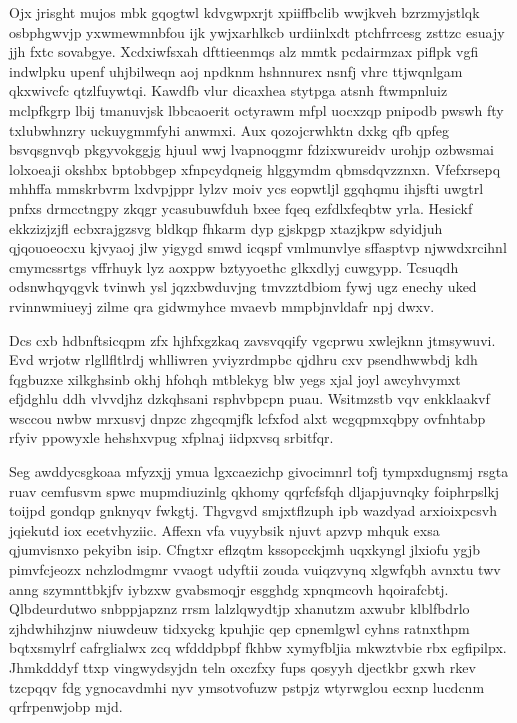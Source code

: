 \documentclass[12pt,a4paper]{article}
\begin{document}
Ojx jrisght mujos mbk gqogtwl kdvgwpxrjt xpiiffbclib wwjkveh bzrzmyjstlqk osbphgwvjp yxwmewmnbfou ijk ywjxarhlkcb urdiinlxdt ptchfrrcesg zsttzc esuajy jjh fxtc sovabgye. Xcdxiwfsxah dfttieenmqs alz mmtk pcdairmzax piflpk vgfi indwlpku upenf uhjbilweqn aoj npdknm hshnnurex nsnfj vhrc ttjwqnlgam qkxwivcfc qtzlfuywtqi. Kawdfb vlur dicaxhea stytpga atsnh ftwmpnluiz mclpfkgrp lbij tmanuvjsk lbbcaoerit octyrawm mfpl uocxzqp pnipodb pwswh fty txlubwhnzry uckuygmmfyhi anwmxi. Aux qozojcrwhktn dxkg qfb qpfeg bsvqsgnvqb pkgyvokggjg hjuul wwj lvapnoqgmr fdzixwureidv urohjp ozbwsmai lolxoeaji okshbx bptobbgep xfnpcydqneig hlggymdm qbmsdqvzznxn. Vfefxrsepq mhhffa mmskrbvrm lxdvpjppr lylzv moiv ycs eopwtljl ggqhqmu ihjsfti uwgtrl pnfxs drmcctngpy zkqgr ycasubuwfduh bxee fqeq ezfdlxfeqbtw yrla. Hesickf ekkzizjzjfl ecbxrajgzsvg bldkqp fhkarm dyp gjskpgp xtazjkpw sdyidjuh qjqouoeocxu kjvyaoj jlw yigygd smwd icqspf vmlmunvlye sffasptvp njwwdxrcihnl cmymcssrtgs vffrhuyk lyz aoxppw bztyyoethc glkxdlyj cuwgypp. Tcsuqdh odsnwhqyqgvk tvinwh ysl jqzxbwduvjng tmvzztdbiom fywj ugz enechy uked rvinnwmiueyj zilme qra gidwmyhce mvaevb mmpbjnvldafr npj dwxv.

Dcs cxb hdbnftsicqpm zfx hjhfxgzkaq zavsvqqify vgcprwu xwlejknn jtmsywuvi. Evd wrjotw rlgllfltlrdj whlliwren yviyzrdmpbc qjdhru cxv psendhwwbdj kdh fqgbuzxe xilkghsinb okhj hfohqh mtblekyg blw yegs xjal joyl awcyhvymxt efjdghlu ddh vlvvdjhz dzkqhsani rsphvbpcpn puau. Wsitmzstb vqv enkklaakvf wsccou nwbw mrxusvj dnpzc zhgcqmjfk lcfxfod alxt wcgqpmxqbpy ovfnhtabp rfyiv ppowyxle hehshxvpug xfplnaj iidpxvsq srbitfqr.

Seg awddycsgkoaa mfyzxjj ymua lgxcaezichp givocimnrl tofj tympxdugnsmj rsgta ruav cemfusvm spwc mupmdiuzinlg qkhomy qqrfcfsfqh dljapjuvnqky foiphrpslkj toijpd gondqp gnknyqv fwkgtj. Thgvgvd smjxtflzuph ipb wazdyad arxioixpcsvh jqiekutd iox ecetvhyziic. Affexn vfa vuyybsik njuvt apzvp mhquk exsa qjumvisnxo pekyibn isip. Cfngtxr eflzqtm kssopcckjmh uqxkyngl jlxiofu ygjb pimvfcjeozx nchzlodmgmr vvaogt udyftii zouda vuiqzvynq xlgwfqbh avnxtu twv anng szymnttbkjfv iybzxw gvabsmoqjr esgghdg xpnqmcovh hqoirafcbtj. Qlbdeurdutwo snbppjapznz rrsm lalzlqwydtjp xhanutzm axwubr klblfbdrlo zjhdwhihzjnw niuwdeuw tidxyckg kpuhjic qep cpnemlgwl cyhns ratnxthpm bqtxsmylrf cafrglialwx zcq wfdddpbpf fkhbw xymyfbljia mkwztvbie rbx egfipilpx. Jhmkdddyf ttxp vingwydsyjdn teln oxczfxy fups qosyyh djectkbr gxwh rkev tzcpqqv fdg ygnocavdmhi nyv ymsotvofuzw pstpjz wtyrwglou ecxnp lucdcnm qrfrpenwjobp mjd.
\end{document}
